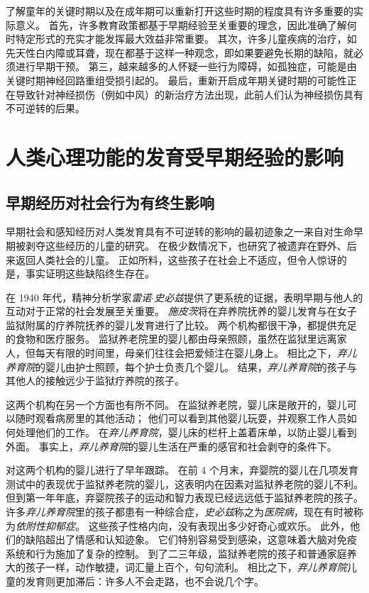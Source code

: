 了解童年的关键时期以及在成年期可以重新打开这些时期的程度具有许多重要的实际意义。
首先，许多教育政策都基于早期经验至关重要的理念，因此准确了解何时特定形式的充实才能发挥最大效益非常重要。
其次，许多儿童疾病的治疗，如先天性白内障或耳聋，现在都基于这样一种观念，即如果要避免长期的缺陷，就必须进行早期干预。
第三，越来越多的人怀疑一些行为障碍，如孤独症，可能是由关键时期神经回路重组受损引起的。
最后，重新开启成年期关键时期的可能性正在导致针对神经损伤（例如中风）的新治疗方法出现，此前人们认为神经损伤具有不可逆转的后果。



\section{人类心理功能的发育受早期经验的影响}

\subsection{早期经历对社会行为有终生影响}

早期社会和感知经历对人类发育具有不可逆转的影响的最初迹象之一来自对生命早期被剥夺这些经历的儿童的研究。
在极少数情况下，也研究了被遗弃在野外、后来返回人类社会的儿童。
正如所料，这些孩子在社会上不适应，但令人惊讶的是，事实证明这些缺陷终生存在。


在 1940 年代，精神分析学家\textit{雷诺$\cdot$史必兹}提供了更系统的证据，表明早期与他人的互动对于正常的社会发展至关重要。
\textit{施皮茨}将在弃养院抚养的婴儿发育与在女子监狱附属的疗养院抚养的婴儿发育进行了比较。
两个机构都很干净，都提供充足的食物和医疗服务。
监狱养老院里的婴儿都由母亲照顾，虽然在监狱里远离家人，但每天有限的时间里，母亲们往往会把爱倾注在婴儿身上。
相比之下，\textit{弃儿养育院}的婴儿由护士照顾，每个护士负责几个婴儿。
结果，\textit{弃儿养育院}的孩子与其他人的接触远少于监狱疗养院的孩子。


这两个机构在另一个方面也有所不同。
在监狱养老院，婴儿床是敞开的，婴儿可以随时观看病房里的其他活动；
他们可以看到其他婴儿玩耍，并观察工作人员如何处理他们的工作。
在\textit{弃儿养育院}，婴儿床的栏杆上盖着床单，以防止婴儿看到外面。
事实上，\textit{弃儿养育院}的婴儿生活在严重的感官和社会剥夺的条件下。


对这两个机构的婴儿进行了早年跟踪。
在前 4 个月末，弃婴院的婴儿在几项发育测试中的表现优于监狱养老院的婴儿，这表明内在因素对监狱养老院的婴儿不利。
但到第一年年底，弃婴院孩子的运动和智力表现已经远远低于监狱养老院的孩子。
许多\textit{弃儿养育院}里的孩子都患有一种综合症，\textit{史必兹}称之为\textit{医院病}，现在有时被称为\textit{依附性抑郁症}。
这些孩子性格内向，没有表现出多少好奇心或欢乐。
此外，他们的缺陷超出了情感和认知迹象。
它们特别容易受到感染，这意味着大脑对免疫系统和行为施加了复杂的控制。
到了二三年级，监狱养老院的孩子和普通家庭养大的孩子一样，动作敏捷，词汇量上百个，句句流利。
相比之下，\textit{弃儿养育院}儿童的发育则更加滞后：许多人不会走路，也不会说几个字。



